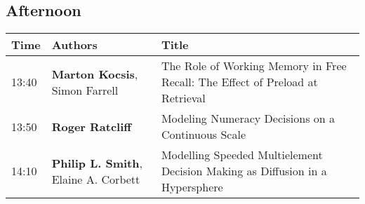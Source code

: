 \documentclass[]{article}
\begin{document}
\subsection{Afternoon}\label{afternoon-1}

\begin{longtable}[]{@{}lll@{}}
\toprule
\begin{minipage}[b]{0.03\columnwidth}\raggedright\strut
Time\strut
\end{minipage} & \begin{minipage}[b]{0.32\columnwidth}\raggedright\strut
Authors\strut
\end{minipage} & \begin{minipage}[b]{0.57\columnwidth}\raggedright\strut
Title\strut
\end{minipage}\tabularnewline
\midrule
\endhead
\begin{minipage}[t]{0.03\columnwidth}\raggedright\strut
13:40\strut
\end{minipage} & \begin{minipage}[t]{0.32\columnwidth}\raggedright\strut
\textbf{Marton Kocsis}, Simon Farrell\strut
\end{minipage} & \begin{minipage}[t]{0.57\columnwidth}\raggedright\strut
The Role of Working Memory in Free Recall: The Effect of Preload at
Retrieval\strut
\end{minipage}\tabularnewline
\begin{minipage}[t]{0.03\columnwidth}\raggedright\strut
13:50\strut
\end{minipage} & \begin{minipage}[t]{0.32\columnwidth}\raggedright\strut
\textbf{Roger Ratcliff}\strut
\end{minipage} & \begin{minipage}[t]{0.57\columnwidth}\raggedright\strut
Modeling Numeracy Decisions on a Continuous Scale\strut
\end{minipage}\tabularnewline
\begin{minipage}[t]{0.03\columnwidth}\raggedright\strut
14:10\strut
\end{minipage} & \begin{minipage}[t]{0.32\columnwidth}\raggedright\strut
\textbf{Philip L. Smith}, Elaine A. Corbett\strut
\end{minipage} & \begin{minipage}[t]{0.57\columnwidth}\raggedright\strut
Modelling Speeded Multielement Decision Making as Diffusion in a
Hypersphere\strut
\end{minipage}\tabularnewline

\end{longtable}
\end{document}
